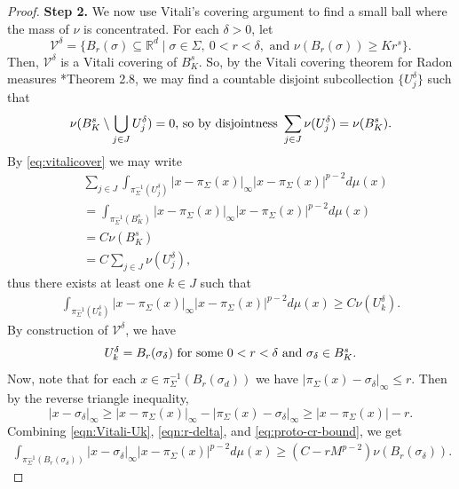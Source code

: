 \documentclass[preprint, reqno]{amsart}
\theoremstyle{definition}
\numberwithin{equation}{section}
\begin{document}
\begin{proof}
  \textbf{Step 2.} We now use Vitali's covering argument to find a small
  ball where the mass of $\nu$ is concentrated. For each $\delta>0$,
  let
  \[
    \mathcal{V}^{\delta} = \{B_r(\sigma) \subseteq \mathbb R^d
    \mid \sigma \in \Sigma, \ 0 < r < \delta, \text{ and
    }\nu(B_r(\sigma)) \geq K r^s\}.
  \]
  Then, $\mathcal{V}^{\delta}$ is a Vitali covering of $B^s_K$. So, by
  the Vitali covering theorem for Radon measures
  \cite{Mattila95}*{Theorem 2.8}, we may find a countable disjoint
  subcollection $\{ U^\delta_j\}$ such that
  \begin{equation}
    \label{eq:vitalicover}
    \nu(B_K^s \setminus \bigcup_{j \in J}U^\delta_j)= 0 \hbox{, so
      by disjointness }
    \sum_{j \in J}\nu(U^\delta_j) = \nu(B_K^s).
  \end{equation}
  By \eqref{eq:vitalicover} we may write
  \begin{align*}
    & \sum_{j \in J} \int_{\pi_{\Sigma}^{-1}(U^\delta_j)}
      |x-\pi_\Sigma (x)|_{\infty} |x-\pi_{\Sigma}(x)|^{p-2}d\mu(x) \\
    & = \int_{\pi_{\Sigma}^{-1}(B_K^s)} |x-\pi_\Sigma(x)|_{\infty}
      |x-\pi_{\Sigma}(x)|^{p-2} d\mu(x)\\
    & = C \nu(B_K^s)\\
    & = C\sum_{j \in J}\nu(U^\delta_j),
  \end{align*}
  thus
  there exists at least one $k \in J$ such that
  \begin{align}\label{eqn:Vitali-Uk}
    \int_{\pi_{\Sigma}^{-1}(U^\delta_k)} |x-\pi_\Sigma(x)|_{\infty}
    |x-\pi_{\Sigma}(x)|^{p-2}d\mu(x) \geq C \nu(U^\delta_k).
  \end{align}
  By construction of $\mathcal{V}^{\delta}$, we have
  \begin{align}\label{eqn:r-delta}
    \hbox{$U^\delta_k = B_{r}(\sigma_{\delta})$ for some $0 < r <
    \delta$ and $\sigma_{\delta} \in B_{K}^s$.}
  \end{align}
  Now, note that for each $x \in \pi_\Sigma^{-1}(B_r(\sigma_d))$ we have
  $|\pi_\Sigma(x) - \sigma_\delta|_\infty \le r$. Then by the reverse
  triangle inequality,
  \begin{equation}
    \label{eq:proto-cr-bound}
    \lvert x - \sigma_\delta \rvert_\infty \geq \lvert x -
    \pi_\Sigma(x) \rvert_\infty - \lvert \pi_\Sigma(x) - \sigma_\delta
    \rvert_\infty \geq \lvert x - \pi_\Sigma(x)
    \rvert - r.
  \end{equation}
  Combining \eqref{eqn:Vitali-Uk}, \eqref{eqn:r-delta}, and
  \eqref{eq:proto-cr-bound}, we get
  \begin{align}\label{eqn:with-sigma-delta}
    \int_{\pi_{\Sigma}^{-1}(B_r(\sigma_\delta))}
    |x-\sigma_\delta|_{\infty} |x-\pi_{\Sigma}(x)|^{p-2}d\mu(x) \geq (C
    - r M^{p-2}) \nu(B_r(\sigma_\delta)).
  \end{align}



\end{proof}
\end{document}
